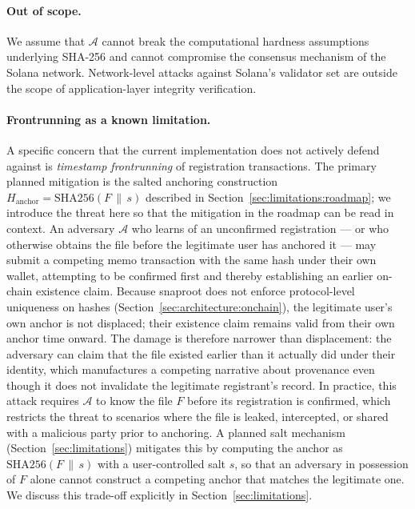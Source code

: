 \documentclass[11pt,a4paper]{article}
\begin{document}
\paragraph{Out of scope.} We assume that $\mathcal{A}$ cannot break the
computational hardness assumptions underlying SHA-256 and cannot compromise
the consensus mechanism of the Solana network. Network-level attacks
against Solana's validator set are outside the scope of application-layer
integrity verification.

\paragraph{Frontrunning as a known limitation.} A specific concern
that the current implementation does not actively defend against is
\emph{timestamp frontrunning} of registration transactions. The
primary planned mitigation is the salted anchoring construction
$H_{\mathrm{anchor}} = \mathrm{SHA256}(F \,\|\, s)$ described in
Section~\ref{sec:limitations:roadmap}; we introduce the threat here
so that the mitigation in the roadmap can be read in context. An
adversary $\mathcal{A}$ who learns of an unconfirmed registration
--- or who otherwise obtains the file before the legitimate user
has anchored it --- may submit a competing memo transaction with the
same hash under their own wallet, attempting to be confirmed first
and thereby establishing an earlier on-chain existence claim. Because
snaproot does not enforce protocol-level uniqueness on hashes
(Section~\ref{sec:architecture:onchain}), the legitimate user's own
anchor is not displaced; their existence claim remains valid from
their own anchor time onward. The damage is therefore narrower than
displacement: the adversary can claim that the file existed earlier
than it actually did under their identity, which manufactures a
competing narrative about provenance even though it does not invalidate
the legitimate registrant's record. In practice, this attack requires
$\mathcal{A}$ to know the file $F$ before its registration is
confirmed, which restricts the threat to scenarios where the file is
leaked, intercepted, or shared with a malicious party prior to
anchoring. A planned salt mechanism (Section~\ref{sec:limitations})
mitigates this by computing the anchor as
$\mathrm{SHA256}(F\,\|\,s)$ with a user-controlled salt $s$, so that
an adversary in possession of $F$ alone cannot construct a competing
anchor that matches the legitimate one. We discuss this trade-off
explicitly in Section~\ref{sec:limitations}.
\end{document}
